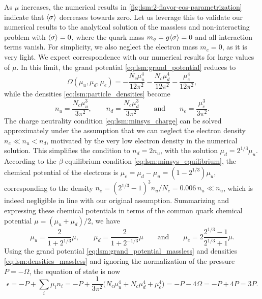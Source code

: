 As $\mu$ increases, the numerical results in \cref{fig:lsm:2-flavor-eos-parametrization} indicate that $\langle \sigma \rangle$ decreases towards zero.
Let us leverage this to validate our numerical results to the analytical solution of the massless and non-interacting problem with $\langle \sigma \rangle = 0$,
where the quark mass $m_q = g \langle \sigma \rangle = 0$ and all interaction terms vanish.
For simplicity, we also neglect the electron mass $m_e = 0$, as it is very light.
We expect correspondence with our numerical results for large values of $\mu$.
In this limit, the grand potential \eqref{eq:lsm:grand_potential} reduces to
\begin{equation}
	\Omega(\mu_u, \mu_d, \mu_e) = -\frac{N_c \mu_u^4}{12 \pi^2} - \frac{N_c \mu_d^4}{12 \pi^2} - \frac{\mu_e^4}{12 \pi^2},
\label{eq:lsm:grand_potential_massless}
\end{equation}
while the densities \eqref{eq:lsm:particle_densities} become 
\begin{equation}
	n_u = \frac{N_c \mu_u^3}{3 \pi^2}, \qquad
	n_d = \frac{N_c \mu_d^3}{3 \pi^2}  \qquad \text{and} \qquad
	n_e = \frac{\mu_e^3}{3 \pi^2}.
\label{eq:lsm:densities_massless}
\end{equation}
The charge neutrality condition \eqref{eq:lsm:minsys_charge} can be solved approximately under the assumption that we can neglect the electron density $n_e \ll n_u < n_d$,
motivated by the very low electron density in the numerical solution.
This simplifies the condition to $n_d = 2 n_u$, with the solution $\mu_d = 2^{1/3} \mu_u$.
According to the $\beta$-equilibrium condition \eqref{eq:lsm:minsys_equilibrium},
the chemical potential of the electrons is $\mu_e = \mu_d - \mu_u = (1-2^{1/3}) \mu_u$,
corresponding to the density $n_e = (2^{1/3}-1)^3 n_u / N_c = 0.006 \, n_u \ll n_u$,
which is indeed negligible in line with our original assumption.
Summarizing and expressing these chemical potentials in terms of the common quark chemical potential $\mu = (\mu_u+\mu_d)/2$, we have
\begin{equation}
	\mu_u = \frac{2}{1+2^{1/3}} \mu, \qquad
	\mu_d = \frac{2}{1+2^{-1/3}} \mu \qquad \text{and} \qquad
	\mu_e = 2 \frac{2^{1/3}-1}{2^{1/3}+1} \mu.
\label{eq:lsm:chemical_potentials_massless}
\end{equation}
Using the grand potential \eqref{eq:lsm:grand_potential_massless} and densities \eqref{eq:lsm:densities_massless} and ignoring the normalization of the pressure $P = -\Omega$, the equation of state is now
\begin{equation}
	\epsilon = -P + \sum_i \mu_i n_i = -P + \frac{1}{3 \pi^2} \Big(N_c \mu_u^4 + N_c \mu_d^4 + \mu_e^4\Big) = -P - 4 \Omega = -P + 4 P = 3 P .
\end{equation}
